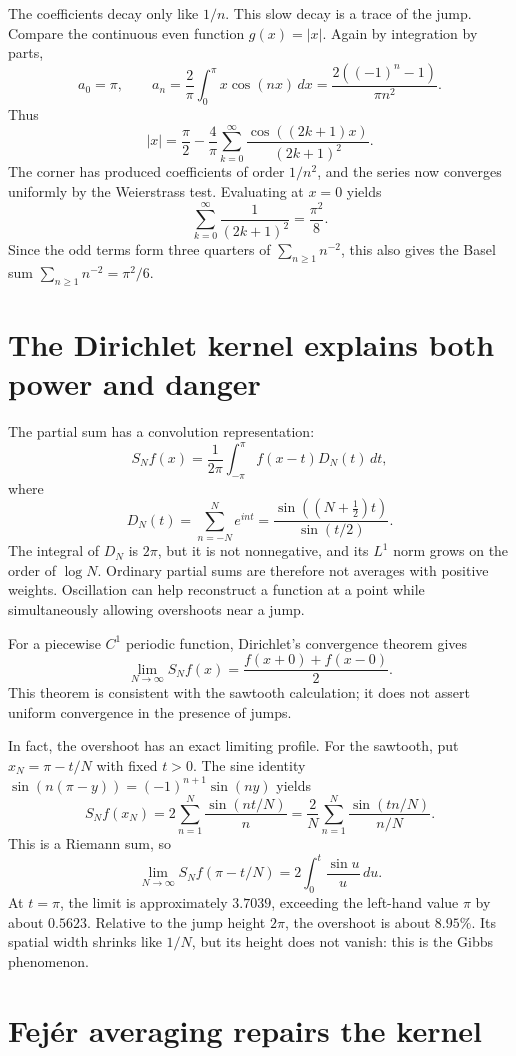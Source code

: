The coefficients decay only like \(1/n\). This slow decay is a trace of the jump. Compare the continuous even function \(g(x)=|x|\). Again by integration by parts,
\[
 a_0=\pi,\qquad
 a_n=\frac2\pi\int_0^\pi x\cos(nx)\,dx
     =\frac{2((-1)^n-1)}{\pi n^2}.
\]
Thus
\[
 \boxed{|x|=\frac\pi2-\frac4\pi
       \sum_{k=0}^{\infty}
       \frac{\cos((2k+1)x)}{(2k+1)^2}.}
\]
The corner has produced coefficients of order \(1/n^2\), and the series now converges uniformly by the Weierstrass test. Evaluating at \(x=0\) yields
\[
 \sum_{k=0}^{\infty}\frac1{(2k+1)^2}
 =\frac{\pi^2}{8}.
\]
Since the odd terms form three quarters of \(\sum_{n\ge1}n^{-2}\), this also gives the Basel sum \(\sum_{n\ge1}n^{-2}=\pi^2/6\).

\section{The Dirichlet kernel explains both power and danger}

The partial sum has a convolution representation:
\[
 S_Nf(x)=\frac1{2\pi}
  \int_{-\pi}^{\pi}f(x-t)D_N(t)\,dt,
\]
where
\[
 \boxed{D_N(t)=\sum_{n=-N}^{N}e^{int}
 =\frac{\sin((N+\tfrac12)t)}{\sin(t/2)}.}
\]
The integral of \(D_N\) is \(2\pi\), but it is not nonnegative, and its \(L^1\) norm grows on the order of \(\log N\). Ordinary partial sums are therefore not averages with positive weights. Oscillation can help reconstruct a function at a point while simultaneously allowing overshoots near a jump.

For a piecewise \(C^1\) periodic function, Dirichlet's convergence theorem gives
\[
 \lim_{N\to\infty}S_Nf(x)
 =\frac{f(x+0)+f(x-0)}2.
\]
This theorem is consistent with the sawtooth calculation; it does not assert uniform convergence in the presence of jumps.

In fact, the overshoot has an exact limiting profile. For the sawtooth, put \(x_N=\pi-t/N\) with fixed \(t>0\). The sine identity
\(\sin(n(\pi-y))=(-1)^{n+1}\sin(ny)\) yields
\[
 S_Nf(x_N)
 =2\sum_{n=1}^N\frac{\sin(nt/N)}n
 =\frac2N\sum_{n=1}^N
   \frac{\sin(tn/N)}{n/N}.
\]
This is a Riemann sum, so
\[
 \boxed{\lim_{N\to\infty}S_Nf(\pi-t/N)
 =2\int_0^t\frac{\sin u}{u}\,du.}
\]
At \(t=\pi\), the limit is approximately \(3.7039\), exceeding the left-hand value \(\pi\) by about \(0.5623\). Relative to the jump height \(2\pi\), the overshoot is about \(8.95\%\). Its spatial width shrinks like \(1/N\), but its height does not vanish: this is the Gibbs phenomenon.

\section{Fejér averaging repairs the kernel}

